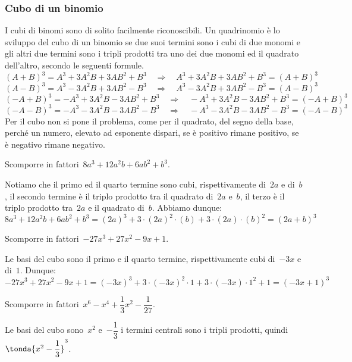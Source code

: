 \subsubsection{Cubo di un binomio}
\label{subsubsec:divpol_cubobin}

I cubi di binomi sono di solito facilmente riconoscibili. Un quadrinomio è lo 
sviluppo del cubo di un binomio se due suoi termini sono i cubi di due monomi 
e gli altri due termini sono i tripli prodotti tra uno dei due monomi ed il 
quadrato dell'altro, secondo le seguenti formule.
\[(A+B)^{3}=A^{3}+3A^{2}B+3AB^{2}+B^{3}\quad \Rightarrow \quad 
A^{3}+3A^{2}B+3AB^{2}+B^{3}=(A+B)^{3}\]
\[(A-B)^{3}=A^{3}-3A^{2}B+3AB^{2}-B^{3}\quad \Rightarrow \quad 
A^{3}-3A^{2}B+3AB^{2}-B^{3}=(A-B)^{3}\]
\[(-A+B)^{3}=-A^{3}+3A^{2}B-3AB^{2}+B^{3}\quad \Rightarrow \quad 
-A^{3}+3A^{2}B-3AB^{2}+B^{3}=(-A+B)^{3}\]
\[(-A-B)^{3}=-A^{3}-3A^{2}B-3AB^{2}-B^{3}\quad \Rightarrow \quad 
-A^{3}-3A^{2}B-3AB^{2}-B^{3}=(-A-B)^{3}\]
Per il cubo non si pone il problema, come per il quadrato, del segno della 
base, perché un numero, elevato ad esponente dispari, se è positivo rimane 
positivo, se è negativo rimane negativo.

 \begin{esempio}
Scomporre in fattori~\(8a^{3}+12a^{2}b+6{ab}^{2}+b^{3}\).

Notiamo che il primo ed il quarto termine sono cubi, rispettivamente 
di~\(2a\) e di~\(b\), 
il secondo termine è il triplo prodotto tra il quadrato di~\(2a\) e~\(b\), 
il terzo è il triplo prodotto tra~\(2a\) e il quadrato di~\(b\).
Abbiamo dunque:
\[8a^{3}+12a^{2}b+6ab^{2}+b^{3}=
  (2a)^{3}+3\cdot (2a)^{2}\cdot (b)+3\cdot (2a)\cdot (b)^{2}=(2a+b)^{3}\]
 \end{esempio}

 \begin{esempio}
Scomporre in fattori~\(-27x^3+27x^2-9x+1\).

Le basi del cubo sono il primo e il quarto termine, rispettivamente cubi 
di~\(-3x\) e di~\(1\).
Dunque:
\[-27x^3+27x^2-9x+1=
  (-3x)^{3}+3\cdot (-3x)^{2}\cdot 1+3\cdot (-3x)\cdot 1^{2}+1=(-3x+1)^{3}\]
 \end{esempio}

 \begin{esempio}
Scomporre in fattori~\(x^6-x^4+\dfrac{1}{3}x^2-\dfrac{1}{27}\).

Le basi del cubo sono~\(x^2\) e~\(-\dfrac{1}{3}\) i termini centrali sono i 
tripli prodotti, quindi~\(\tonda{x^2-\dfrac{1}{3}}^{3}\).
\end{esempio}



